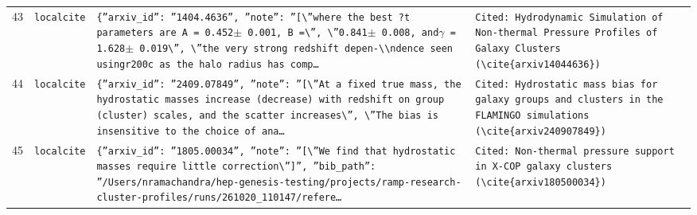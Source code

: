 \documentclass[11pt,a4paper]{article}
\begin{document}
\begin{longtable}{@{}p{}p{}p{}p{}@{}}
43 & \texttt{local}\newline\texttt{cite} & \texttt{\{''arxiv\_\allowbreak{}id'':\allowbreak{} ''1404.4636'',\allowbreak{} ''note'':\allowbreak{} ''[\textbackslash{}\allowbreak{}''where the best ?t parameters are A =\allowbreak{} 0.452$\pm$ 0.001,\allowbreak{} B =\allowbreak{}\textbackslash{}\allowbreak{}'',\allowbreak{} \textbackslash{}\allowbreak{}''0.841$\pm$ 0.008,\allowbreak{} and$\gamma$ =\allowbreak{} 1.628$\pm$ 0.019\textbackslash{}\allowbreak{}'',\allowbreak{} \textbackslash{}\allowbreak{}''the very strong redshift depen-\textbackslash{}\allowbreak{}\textbackslash{}\allowbreak{}ndence seen usingr200c as the halo radius has comp\ldots{}\allowbreak{}} & \texttt{Cited:\allowbreak{} Hydrodynamic Simulation of Non-thermal Pressure Profiles of Galaxy Clusters (\textbackslash{}\allowbreak{}cite\{arxiv14044636\}\allowbreak{})\allowbreak{}} \\
44 & \texttt{local}\newline\texttt{cite} & \texttt{\{''arxiv\_\allowbreak{}id'':\allowbreak{} ''2409.07849'',\allowbreak{} ''note'':\allowbreak{} ''[\textbackslash{}\allowbreak{}''At a fixed true mass,\allowbreak{} the hydrostatic masses increase (decrease)\allowbreak{} with redshift on group (cluster)\allowbreak{} scales,\allowbreak{} and the scatter increases\textbackslash{}\allowbreak{}'',\allowbreak{} \textbackslash{}\allowbreak{}''The bias is insensitive to the choice of ana\ldots{}\allowbreak{}} & \texttt{Cited:\allowbreak{} Hydrostatic mass bias for galaxy groups and clusters in the FLAMINGO simulations (\textbackslash{}\allowbreak{}cite\{arxiv240907849\}\allowbreak{})\allowbreak{}} \\
45 & \texttt{local}\newline\texttt{cite} & \texttt{\{''arxiv\_\allowbreak{}id'':\allowbreak{} ''1805.00034'',\allowbreak{} ''note'':\allowbreak{} ''[\textbackslash{}\allowbreak{}''We find that hydrostatic masses require little correction\textbackslash{}\allowbreak{}'']\allowbreak{}'',\allowbreak{} ''bib\_\allowbreak{}path'':\allowbreak{} ''/\allowbreak{}Users/\allowbreak{}nramachandra/\allowbreak{}hep-genesis-testing/\allowbreak{}projects/\allowbreak{}ramp-research-cluster-profiles/\allowbreak{}runs/\allowbreak{}261020\_\allowbreak{}110147/\allowbreak{}refere\ldots{}\allowbreak{}} & \texttt{Cited:\allowbreak{} Non-thermal pressure support in X-COP galaxy clusters (\textbackslash{}\allowbreak{}cite\{arxiv180500034\}\allowbreak{})\allowbreak{}} \\

\end{longtable}
\end{document}
